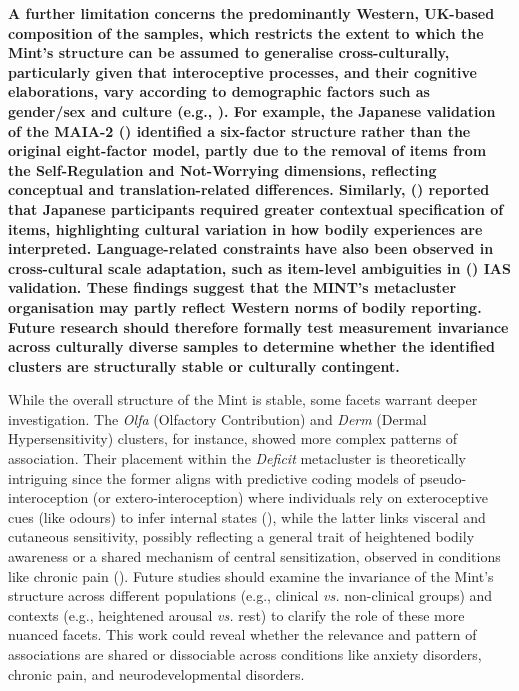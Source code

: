 \documentclass[
  man,
  floatsintext,
  longtable,
  nolmodern,
  notxfonts,
  notimes,
  mask,
  colorlinks=true,linkcolor=blue,citecolor=blue,urlcolor=blue]{apa7}
\begin{document}
\textbf{A further limitation concerns the predominantly Western,
UK-based composition of the samples, which restricts the extent to which
the Mint's structure can be assumed to generalise cross-culturally,
particularly given that interoceptive processes, and their cognitive
elaborations, vary according to demographic factors such as gender/sex
and culture (e.g., ). For example, the Japanese validation of the MAIA-2
() identified a
six-factor structure rather than the original eight-factor model, partly
due to the removal of items from the Self-Regulation and Not-Worrying
dimensions, reflecting conceptual and translation-related differences.
Similarly, () reported that Japanese participants required greater contextual
specification of items, highlighting cultural variation in how bodily
experiences are interpreted. Language-related constraints have also been
observed in cross-cultural scale adaptation, such as item-level
ambiguities in ()
IAS validation. These findings suggest that the MINT's metacluster
organisation may partly reflect Western norms of bodily reporting.
Future research should therefore formally test measurement invariance
across culturally diverse samples to determine whether the identified
clusters are structurally stable or culturally contingent.}

While the overall structure of the Mint is stable, some facets warrant
deeper investigation. The \emph{Olfa} (Olfactory Contribution) and
\emph{Derm} (Dermal Hypersensitivity) clusters, for instance, showed
more complex patterns of association. Their placement within the
\emph{Deficit} metacluster is theoretically intriguing since the former
aligns with predictive coding models of pseudo-interoception (or
extero-interoception) where individuals rely on exteroceptive cues (like
odours) to infer internal states
(), while
the latter links visceral and cutaneous sensitivity, possibly reflecting
a general trait of heightened bodily awareness or a shared mechanism of
central sensitization, observed in conditions like chronic pain
(). Future
studies should examine the invariance of the Mint's structure across
different populations (e.g., clinical \emph{vs.} non-clinical groups)
and contexts (e.g., heightened arousal \emph{vs.} rest) to clarify the
role of these more nuanced facets. This work could reveal whether the
relevance and pattern of associations are shared or dissociable across
conditions like anxiety disorders, chronic pain, and neurodevelopmental
disorders.
\end{document}
